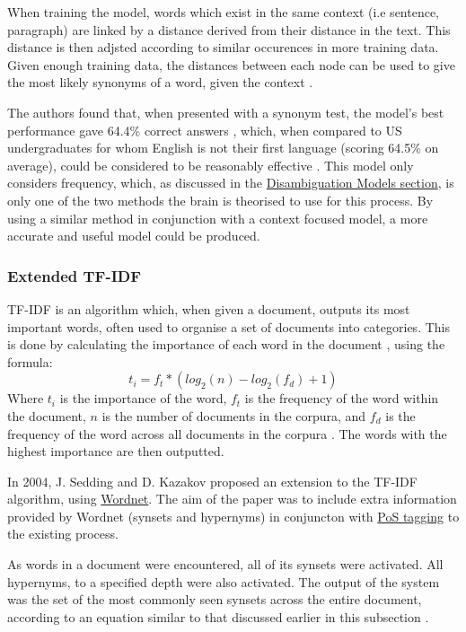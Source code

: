 \documentclass[]{article}
\begin{document}
When training the model, words which exist in the same context (i.e sentence, paragraph) are linked by a distance derived from their distance in the text. This distance is then adjsted according to similar occurences in more training data. Given enough training data, the distances between each node can be used to give the most likely synonyms of a word, given the context \cite{LatentSemanticAnalysis}.

The authors found that, when presented with a synonym test, the model's best performance gave 64.4\% correct answers , which, when compared to US undergraduates for whom English is not their first language (scoring 64.5\% on average), could be considered to be reasonably effective \cite{LatentSemanticAnalysis}. This model only considers frequency, which, as discussed in the \hyperref[sec:DisambiguationModels]{Disambiguation Models section}, is only one of the two methods the brain is theorised to use for this process. By using a similar method in conjunction with a context focused model, a more accurate and useful model could be produced.

\subsubsection{Extended TF-IDF}
\label{sec:TFIDF}

TF-IDF is an algorithm which, when given a document, outputs its most important words, often used to organise a set of documents into categories. This is done by calculating the importance of each word in the document \cite{TFIDF}, using the formula:
\[t_i = f_t * (log_2(n)-log_2(f_d)+1)\]
Where \(t_i\) is the importance of the word, \(f_t\) is the frequency of the word within the document, \(n\) is the number of documents in the corpura, and \(f_d\) is the frequency of the word across all documents in the corpura \cite{SeddingKazakov}. The  words with the highest importance are then outputted.

In 2004, J. Sedding and D. Kazakov proposed an extension to the TF-IDF algorithm, using \hyperref[Wordnet]{Wordnet}. The aim of the paper was to include extra information provided by Wordnet (synsets and hypernyms) in conjuncton with \hyperref[sec:IntroContext]{PoS tagging} to the existing process. 

As words in a document were encountered, all of its synsets were activated. All hypernyms, to a specified depth were also activated. The output of the system was the set of the most commonly seen synsets across the entire document, according to an equation similar to that discussed earlier in this subsection \cite{SeddingKazakov}.
\end{document}
